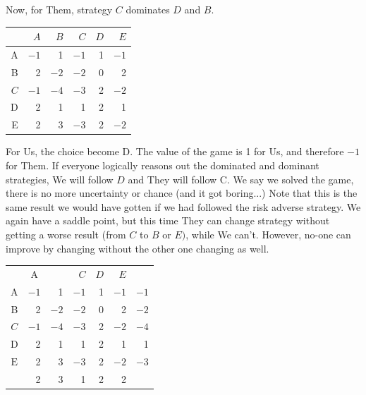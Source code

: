 \documentclass[10pt]{article}
\begin{document}
Now, for Them, strategy $C$ dominates $D$ and $B$.

\begin{tabular}{r|r|r|r|r|r|}
\hline
 & $A$ & $B$ & $C$ & $D$ & $E$ \\
\hline
A & $-1$ & 1 & $-1$ & 1 & $-1$ \\
\cline { 2 - 6 }
B & 2 & $-2$ & $-2$ & 0 & 2 \\
\cline { 2 - 6 }
$C$ & $-1$ & $-4$ & $-3$ & 2 & $-2$ \\
\cline { 2 - 6 }
D & 2 & 1 & 1 & 2 & 1 \\
\cline { 2 - 6 }
E & 2 & 3 & $-3$ & 2 & $-2$ \\
\cline { 2 - 6 }
\end{tabular}

For Us, the choice become D. The value of the game is 1 for Us, and therefore $-1$ for Them. If everyone logically reasons out the dominated and dominant strategies, We will follow $D$ and They will follow C. We say we solved the game, there is no more uncertainty or chance (and it got boring...) Note that this is the same result we would have gotten if we had followed the risk adverse strategy. We again have a saddle point, but this time They can change strategy without getting a worse result (from $C$ to $B$ or $E)$, while We can't. However, no-one can improve by changing without the other one changing as well.

\begin{tabular}{c|r|r|r|r|r|r|}
 & \multicolumn{1}{c|}{A} &  & $C$ & $D$ & $E$ &  \\
\cline { 2 - 6 }
A & $-1$ & 1 & $-1$ & 1 & $-1$ & $-1$ \\
B & 2 & $-2$ & $-2$ & 0 & 2 & $-2$ \\
\cline { 2 - 6 }
$C$ & $-1$ & $-4$ & $-3$ & 2 & $-2$ & $-4$ \\
\cline { 2 - 6 }
D & 2 & 1 & 1 & 2 & 1 & 1 \\
\cline { 2 - 6 }
$\mathrm{E}$ & 2 & 3 & $-3$ & 2 & $-2$ & $-3$ \\
\cline { 2 - 6 }
 & 2 & 3 & 1 & 2 & 2 &  \\
\cline { 2 - 6 }
\end{tabular}
\end{document}
